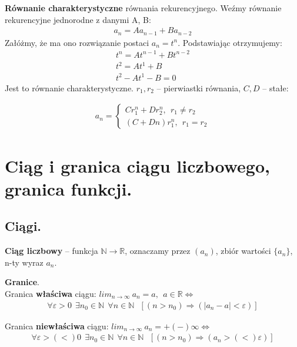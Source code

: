 \documentclass[main.tex]{subfiles}
\begin{document}
    \begin{definition}
        \textbf{Równanie charakterystyczne} równania rekurencyjnego. Weźmy równanie rekurencyjne jednorodne z danymi A, B:
        \begin{align*}
            a_n = A a_{n-1} + B a_{n-2}
        \end{align*}
        Załóżmy, że ma ono rozwiązanie postaci $a_n = t^n$. Podstawiając otrzymujemy:
        \begin{gather*}
            t^n = A t^{n-1} + B t^{n-2}\\
            t^2 = A t^1 + B\\
            t^2 - A t^1 - B = 0
        \end{gather*}
        Jest to równanie charakterystyczne. $r_1, r_2$ -- pierwiastki równania, $C, D$ -- stałe:

        \begin{align*}
            a_n = \left\{\begin{matrix}
                             C r_1^n + D r_2^n, ~~ r_1 \neq r_2\\
                             (C + Dn) r_1^n, ~~ r_1 = r_2
            \end{matrix}\right.
        \end{align*}
    \end{definition}


    \section{Ciąg i granica ciągu liczbowego, granica funkcji.}

    \subsection{Ciągi.}

    \begin{definition}
        \textbf{Ciąg liczbowy} -- funkcja $\mathbb{N} \rightarrow \mathbb{R}$, oznaczamy przez $(a_n)$, zbiór wartości
        $\{a_n\}$, n-ty wyraz $a_n$.
    \end{definition}

    \begin{definition}
        \textbf{Granice}.\\
        Granica \textbf{właściwa} ciągu: $lim_{n  \rightarrow \infty} ~ a_n = a, ~~ a \in \mathbb{R} \Leftrightarrow$
        \begin{gather*}
            \forall \varepsilon > 0 ~~ \exists  n_0 \in \mathbb{N} ~~ \forall n \in \mathbb{N} ~~~ [(n > n_0) \Rightarrow (|a_n - a| < \varepsilon)]
        \end{gather*}

        Granica \textbf{niewłaściwa} ciągu: $lim_{n \rightarrow \infty} ~ a_n = + (-) \infty \Leftrightarrow$
        \begin{align*}
            \forall \varepsilon > (<) 0 ~~ \exists  n_0 \in \mathbb{N} ~~ \forall n \in \mathbb{N} ~~~ [(n > n_0) \Rightarrow (a_n > (<) \varepsilon)]
        \end{align*}
    \end{definition}
\end{document}
